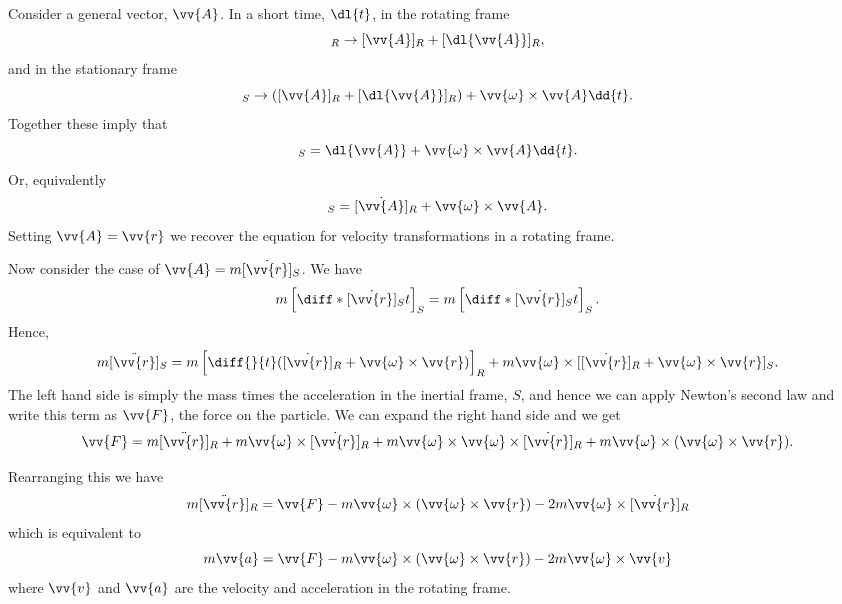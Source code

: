 \documentclass[fleqn]{NotesClass}
\begin{document}
    Consider a general vector, \(\vv{A}\).
    In a short time, \(\dl{t}\), in the rotating frame
    \begin{equation}
        [\vv{A}]_R \to [\vv{A}]_R + [\dl{\vv{A}}]_R,
    \end{equation}
    and in the stationary frame
    \begin{equation}
        [\vv{A}]_S \to ([\vv{A}]_R + [\dl{\vv{A}}]_R) + \vv{\omega}\times\vv{A}\dd{t}.
    \end{equation}
    Together these imply that
    \begin{equation}
        [\dl{\vv{A}}]_S = \dl{\vv{A}} + \vv{\omega}\times\vv{A}\dd{t}.
    \end{equation}
    Or, equivalently
    \begin{equation}
        [\dot{\vv{A}}]_S = [\dot{\vv{A}}]_R + \vv{\omega}\times\vv{A}.
    \end{equation}
    Setting \(\vv{A} = \vv{r}\) we recover the equation for velocity transformations in a rotating frame.
    
    Now consider the case of \(\vv{A} = m[\dot{\vv{r}}]_S\).
    We have
    \begin{align}
        m\left[ \diff*{[\dot{\vv{r}}]_S}{t} \right]_S = m\left[ \diff*{[\dot{\vv{r}}]_S}{t} \right]_S.
    \end{align}
    Hence,
    \begin{equation}
        m[\ddot{\vv{r}}]_S = m\left[ \diff{}{t}([\dot{\vv{r}}]_R + \vv{\omega}\times\vv{r}) \right]_R + m\vv{\omega} \times [[\dot{\vv{r}}]_R + \vv{\omega}\times\vv{r}]_S.
    \end{equation}
    The left hand side is simply the mass times the acceleration in the inertial frame, \(S\), and hence we can apply Newton's second law and write this term as \(\vv{F}\), the force on the particle.
    We can expand the right hand side and we get
    \begin{equation}
        \vv{F} = m[\ddot{\vv{r}}]_R + m\vv{\omega}\times[\dot{\vv{r}}]_R + m\vv{\omega}\times\vv{\omega}\times[\dot{\vv{r}}]_R + m\vv{\omega}\times(\vv{\omega}\times\vv{r}).
    \end{equation}
    
    Rearranging this we have
    \begin{equation}
        m[\ddot{\vv{r}}]_R = \vv{F} - m\vv{\omega}\times(\vv{\omega}\times\vv{r}) - 2m\vv{\omega}\times[\dot{\vv{r}}]_R
    \end{equation}
    which is equivalent to
    \begin{equation}
        m\vv{a} = \vv{F} - m\vv{\omega}\times(\vv{\omega} \times \vv{r}) - 2m\vv{\omega}\times\vv{v}
    \end{equation}
    where \(\vv{v}\) and \(\vv{a}\) are the velocity and acceleration in the rotating frame.
    
\end{document}
